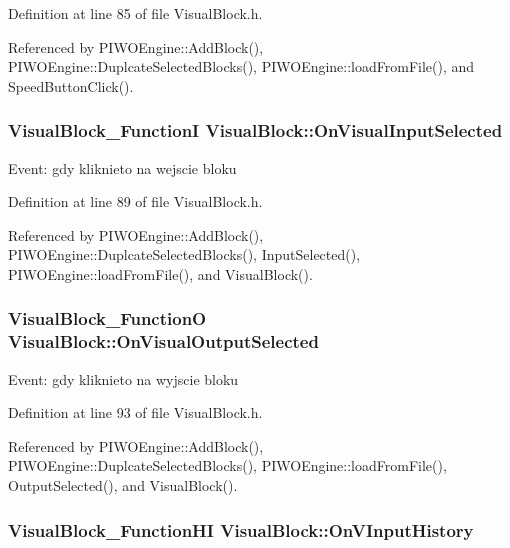 Definition at line 85 of file VisualBlock.h.

Referenced by PIWOEngine::AddBlock(), PIWOEngine::DuplcateSelectedBlocks(), PIWOEngine::loadFromFile(), and SpeedButtonClick().\hypertarget{classVisualBlock_8fc6c9338da4af652d7d1fe170754f7b}{
\subsubsection[OnVisualInputSelected]{\setlength{\rightskip}{0pt plus 5cm}VisualBlock\_\-FunctionI {\bf VisualBlock::OnVisualInputSelected}}}
\label{classVisualBlock_8fc6c9338da4af652d7d1fe170754f7b}


Event: gdy kliknieto na wejscie bloku 

Definition at line 89 of file VisualBlock.h.

Referenced by PIWOEngine::AddBlock(), PIWOEngine::DuplcateSelectedBlocks(), InputSelected(), PIWOEngine::loadFromFile(), and VisualBlock().\hypertarget{classVisualBlock_2c6a85164bf488a2b1055be8331aa813}{
\subsubsection[OnVisualOutputSelected]{\setlength{\rightskip}{0pt plus 5cm}VisualBlock\_\-FunctionO {\bf VisualBlock::OnVisualOutputSelected}}}
\label{classVisualBlock_2c6a85164bf488a2b1055be8331aa813}


Event: gdy kliknieto na wyjscie bloku 

Definition at line 93 of file VisualBlock.h.

Referenced by PIWOEngine::AddBlock(), PIWOEngine::DuplcateSelectedBlocks(), PIWOEngine::loadFromFile(), OutputSelected(), and VisualBlock().\hypertarget{classVisualBlock_aa5ecd1d9c57caa0a9b08ece183dc9da}{
\subsubsection[OnVInputHistory]{\setlength{\rightskip}{0pt plus 5cm}VisualBlock\_\-FunctionHI {\bf VisualBlock::OnVInputHistory}}}
\label{classVisualBlock_aa5ecd1d9c57caa0a9b08ece183dc9da}


